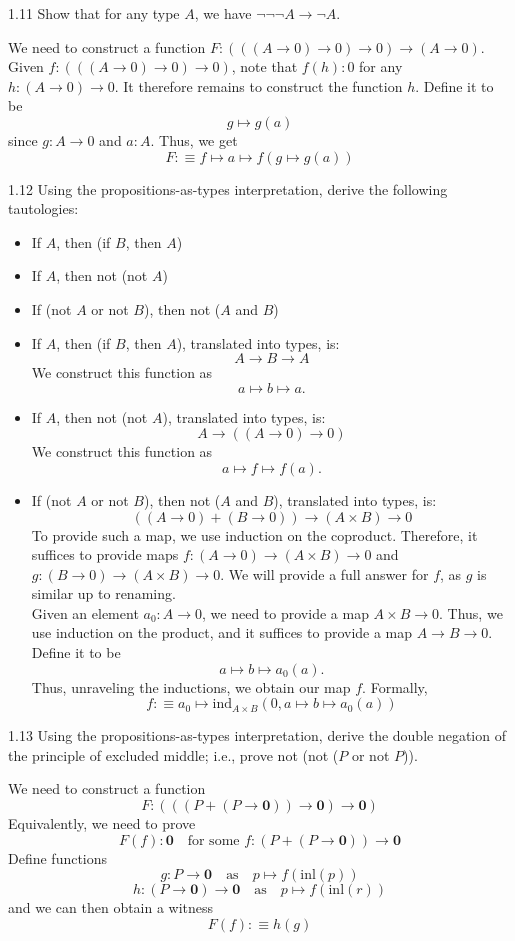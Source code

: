 \documentclass[14pt]{extarticle}
\newcommand{\0}{{\mathbf 0}}
\newcommand{\1}{{\mathbf 1}}
\newcommand{\2}{{\mathbf 2}}
\newcommand{\mt}{\mapsto}
\newcommand{\ind}{\mathrm{ind}}
\newcommand{\inl}{\mathrm{inl}}
\newcommand{\quadt}[1]{\quad \text{#1} \quad}
\begin{document}
\begin{prob}{1.11}{}
Show that for any type $A$, we have $\neg \neg \neg A \to \neg A$.
\end{prob}
We need to construct a function $F : (((A \to 0) \to 0) \to 0) \to (A \to 0)$. Given $f : (((A \to 0) \to 0) \to 0)$, note that $f(h) : 0$ for any $h : (A \to 0) \to 0$. It therefore remains to construct the function $h$. Define it to be
\[g \mt g(a)\] since $g:A \to 0$ and $a : A$. Thus, we get
\[F : \equiv f \mt a \mt f( g \mt g(a))\]

\begin{prob}{1.12}{}
Using the propositions-as-types interpretation, derive the following tautologies:
\begin{itemize}
\item [(i)] If $A$, then (if $B$, then $A$)
\item [(ii)] If $A$, then not (not $A$)
\item [(iii)] If (not $A$ or not $B$), then not ($A$ and $B$)
\end{itemize}
\end{prob}

\begin{itemize}
\item [(i)] If $A$, then (if $B$, then $A$), translated into types, is: \[A \to B \to A\] We construct this function as \[a \mt b \mt a.\]
\item [(ii)] If $A$, then not (not $A$), translated into types, is: \[A \to ((A \to 0) \to 0)\] We construct this function as \[a \mt f \mt f(a).\]
\item [(iii)] If (not $A$ or not $B$), then not ($A$ and $B$), translated into types, is: \[((A \to 0) + (B \to 0)) \to (A\times B) \to 0\] To provide such a map, we use induction on the coproduct. Therefore, it suffices to provide maps $f : (A \to 0) \to (A\times B) \to 0$ and $g : (B \to 0) \to (A\times B) \to 0$. We will provide a full answer for $f$, as $g$ is similar up to renaming.\\
Given an element $a_0 : A \to 0$, we need to provide a map $A\times B \to 0$. Thus, we use induction on the product, and it suffices to provide a map $A \to B \to 0$. Define it to be \[a \mapsto b \mapsto a_0(a).\] Thus, unraveling the inductions, we obtain our map $f$. Formally,
\[f : \equiv a_0 \mt \ind_{A \times B}(0,a \mt b \mt a_0(a))\]
\end{itemize}

\begin{prob}{1.13}{}
Using the propositions-as-types interpretation, derive the double negation of the principle of excluded middle; i.e., prove not (not ($P$ or not $P$)).
\end{prob}
We need to construct a function \[F : (((P + (P \to \0)) \to \0) \to \0)\]
Equivalently, we need to prove
\[F(f) : \0 \quad \text{for some } f : (P + (P \to \0)) \to \0\]
Define functions
\[g : P \to \0 \quadt{as} p \mt f(\inl(p))\]
\[h : (P \to \0) \to \0 \quadt{as} p \mt f(\inl(r))\] and we can then obtain a witness
\[F(f) : \equiv h(g)\]
\end{document}
